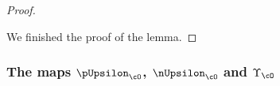 \documentclass[ssunip]{subfiles}
\begin{document}
\begin{proof}
\begin{enumPF}
\begin{enumPF}
  \end{enumPF}
\end{enumPF}
  We finished the proof of the lemma.
\end{proof}

\subsubsection{The maps $\pUpsilon_{\cO}$, $\nUpsilon_{\cO}$ and $\Upsilon_{\cO}$}
\end{document}
